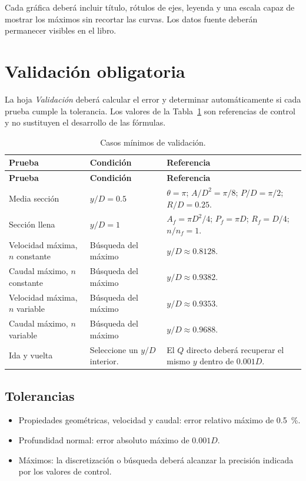 \documentclass[12pt]{article}
\begin{document}
Cada gráfica deberá incluir título, rótulos de ejes, leyenda y una escala capaz de mostrar los máximos sin recortar las curvas. Los datos fuente deberán permanecer visibles en el libro.

\section{Validación obligatoria}
La hoja \emph{Validación} deberá calcular el error y determinar automáticamente si cada prueba cumple la tolerancia. Los valores de la Tabla~\ref{tab:validacion} son referencias de control y no sustituyen el desarrollo de las fórmulas.

\begin{longtable}{>{\raggedright\arraybackslash}p{} >{\raggedright\arraybackslash}p{} >{\raggedright\arraybackslash}p{}}
\caption{Casos mínimos de validación.}\label{tab:validacion}\\
\toprule
\textbf{Prueba} & \textbf{Condición} & \textbf{Referencia} \\
\midrule
\endfirsthead
\toprule
\textbf{Prueba} & \textbf{Condición} & \textbf{Referencia} \\
\midrule
\endhead
Media sección & $y/D=0.5$ & $\theta=\pi$; $A/D^2=\pi/8$; $P/D=\pi/2$; $R/D=0.25$. \\
Sección llena & $y/D=1$ & $A_f=\pi D^2/4$; $P_f=\pi D$; $R_f=D/4$; $n/n_f=1$. \\
Velocidad máxima, $n$ constante & Búsqueda del máximo & $y/D\approx0.8128$. \\
Caudal máximo, $n$ constante & Búsqueda del máximo & $y/D\approx0.9382$. \\
Velocidad máxima, $n$ variable & Búsqueda del máximo & $y/D\approx0.9353$. \\
Caudal máximo, $n$ variable & Búsqueda del máximo & $y/D\approx0.9688$. \\
Ida y vuelta & Seleccione un $y/D$ interior. & El $Q$ directo deberá recuperar el mismo $y$ dentro de $0.001D$. \\
\bottomrule
\end{longtable}

\subsection{Tolerancias}
\begin{itemize}
\item Propiedades geométricas, velocidad y caudal: error relativo máximo de \SI{0.5}{\percent}.
\item Profundidad normal: error absoluto máximo de $0.001D$.
\item Máximos: la discretización o búsqueda deberá alcanzar la precisión indicada por los valores de control.
\end{itemize}
\end{document}
